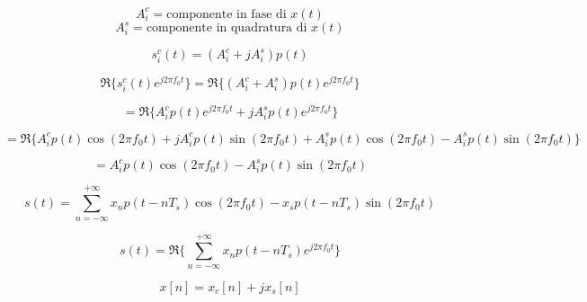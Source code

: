 \[
A^c_i = \text{componente in fase di } x(t)
\]
\[
A^s_i = \text{componente in quadratura di } x(t)
\]

\[
s^c_i(t) = (A^c_i + j A^s_i) p(t)
\]

\[
\Re\{s^c_i(t) e^{j2\pi f_0t}\} = \Re\{(A^c_i + A^s_i) p(t) e^{j2\pi f_0t}\}
\]

\[
= \Re\{A^c_i p(t) e^{j2\pi f_0t} + j A^s_i p(t) e^{j2\pi f_0t}\}
\]

\[
= \Re\{A^c_i p(t) \cos(2\pi f_0t) + j A^c_i p(t) \sin(2\pi f_0t) + A^s_i p(t) \cos(2\pi f_0t) - A^s_i p(t) \sin(2\pi f_0t)\}
\]

\[
= A^c_i p(t) \cos(2\pi f_0t) - A^s_i p(t) \sin(2\pi f_0t)
\]

\[
s(t) = \sum_{n=-\infty}^{+\infty} x_n p(t-nT_s) \cos(2\pi f_0t) - x_s p(t-nT_s) \sin(2\pi f_0t)
\]

\[
s(t) = \Re\{\sum_{n=-\infty}^{+\infty} x_n p(t-nT_s)e^{j2\pi f_0 t}\}
\]

\[
    x[n] = x_c[n] + jx_s[n]
\]

